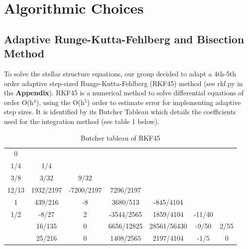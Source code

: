 \documentclass[11pt]{article}
\begin{document}



\dotableofcontents

\section{Algorithmic Choices}
\subsection{Adaptive Runge-Kutta-Fehlberg and Bisection Method}
To solve the stellar structure equations, our group decided to adapt a 4th-5th order adaptive step-sized Runge-Kutta-Fehlberg (RKF45) method (see rkf.py in the \textbf{Appendix}). RKF45 is a numerical method to solve differential equations of order O(h$^4$), using the O(h$^5$) order to estimate error for implementing adaptive step sizes. It is identified by its Butcher Tableau which details the coefficients used for the integration method (see table 1 below).

\begin{table}[h]
\begin{center}
\begin{tabular}{c | c c c c c c}
0 &  & & & & & \\
1/4 & 1/4 & & & & & \\
3/8 & 3/32 & 9/32 & & & & \\
12/13 & 1932/2197 & -7200/2197 & 7296/2197 & & & \\
1 & 439/216 & -8 & 3680/513 & -845/4104 & & \\
1/2 & -8/27 & 2 & -3544/2565 & 1859/4104 & -11/40 & \\
\hline
 & 16/135 & 0 & 6656/12825 & 28561/56430 & -9/50 & 2/55 \\
 & 25/216 & 0 & 1408/2565 & 2197/4104 & -1/5 & 0 \\
\end{tabular}
\caption{Butcher tableau of RKF45}
\end{center}
\end{table}
\end{document}
